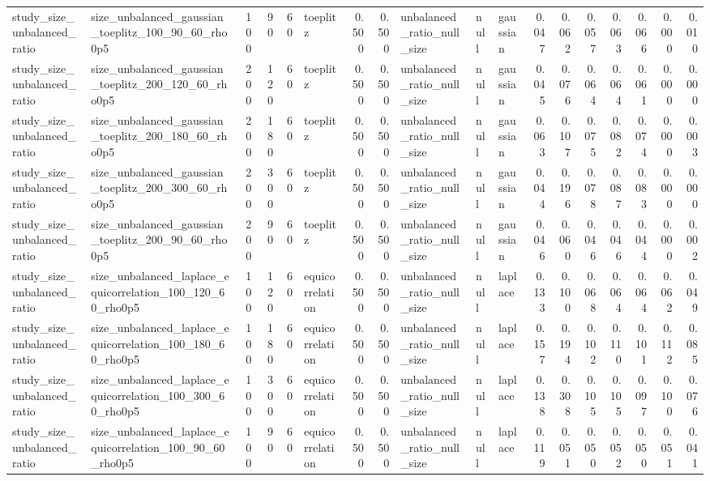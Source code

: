 \begin{tabular}{llrrrlrrlllrrrrrrr}
study\_size\_unbalanced\_ratio & size\_unbalanced\_gaussian\_toeplitz\_100\_90\_60\_rho0p5 & 100 & 90 & 60 & toeplitz & 0.500 & 0.500 & unbalanced\_ratio\_null\_size & null & gaussian & 0.047 & 0.062 & 0.057 & 0.063 & 0.066 & 0.000 & 0.010 \\
study\_size\_unbalanced\_ratio & size\_unbalanced\_gaussian\_toeplitz\_200\_120\_60\_rho0p5 & 200 & 120 & 60 & toeplitz & 0.500 & 0.500 & unbalanced\_ratio\_null\_size & null & gaussian & 0.045 & 0.076 & 0.064 & 0.064 & 0.061 & 0.000 & 0.000 \\
study\_size\_unbalanced\_ratio & size\_unbalanced\_gaussian\_toeplitz\_200\_180\_60\_rho0p5 & 200 & 180 & 60 & toeplitz & 0.500 & 0.500 & unbalanced\_ratio\_null\_size & null & gaussian & 0.063 & 0.107 & 0.075 & 0.082 & 0.074 & 0.000 & 0.003 \\
study\_size\_unbalanced\_ratio & size\_unbalanced\_gaussian\_toeplitz\_200\_300\_60\_rho0p5 & 200 & 300 & 60 & toeplitz & 0.500 & 0.500 & unbalanced\_ratio\_null\_size & null & gaussian & 0.044 & 0.196 & 0.078 & 0.087 & 0.083 & 0.000 & 0.000 \\
study\_size\_unbalanced\_ratio & size\_unbalanced\_gaussian\_toeplitz\_200\_90\_60\_rho0p5 & 200 & 90 & 60 & toeplitz & 0.500 & 0.500 & unbalanced\_ratio\_null\_size & null & gaussian & 0.046 & 0.060 & 0.046 & 0.046 & 0.044 & 0.000 & 0.002 \\
study\_size\_unbalanced\_ratio & size\_unbalanced\_laplace\_equicorrelation\_100\_120\_60\_rho0p5 & 100 & 120 & 60 & equicorrelation & 0.500 & 0.500 & unbalanced\_ratio\_null\_size & null & laplace & 0.133 & 0.100 & 0.068 & 0.064 & 0.064 & 0.062 & 0.049 \\
study\_size\_unbalanced\_ratio & size\_unbalanced\_laplace\_equicorrelation\_100\_180\_60\_rho0p5 & 100 & 180 & 60 & equicorrelation & 0.500 & 0.500 & unbalanced\_ratio\_null\_size & null & laplace & 0.157 & 0.194 & 0.102 & 0.110 & 0.101 & 0.112 & 0.085 \\
study\_size\_unbalanced\_ratio & size\_unbalanced\_laplace\_equicorrelation\_100\_300\_60\_rho0p5 & 100 & 300 & 60 & equicorrelation & 0.500 & 0.500 & unbalanced\_ratio\_null\_size & null & laplace & 0.138 & 0.308 & 0.105 & 0.105 & 0.097 & 0.100 & 0.076 \\
study\_size\_unbalanced\_ratio & size\_unbalanced\_laplace\_equicorrelation\_100\_90\_60\_rho0p5 & 100 & 90 & 60 & equicorrelation & 0.500 & 0.500 & unbalanced\_ratio\_null\_size & null & laplace & 0.119 & 0.051 & 0.050 & 0.052 & 0.050 & 0.051 & 0.041 \\

\end{tabular}
